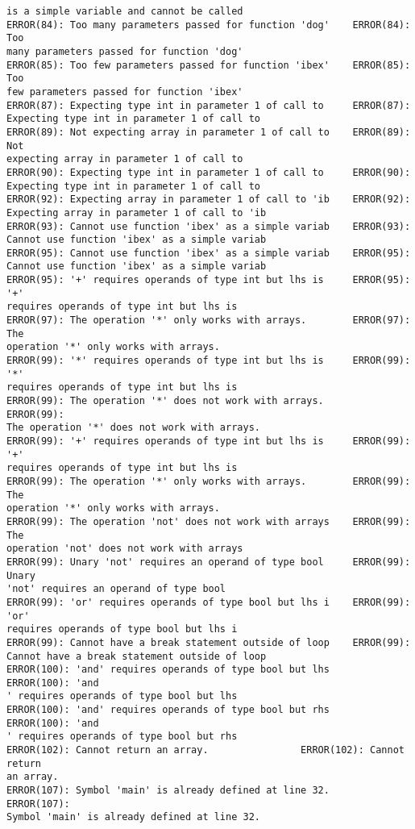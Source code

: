 \documentclass[12pt]{book}
\begin{document}
\begin{lstlisting}
is a simple variable and cannot be called
ERROR(84): Too many parameters passed for function 'dog'    ERROR(84): Too 
many parameters passed for function 'dog'
ERROR(85): Too few parameters passed for function 'ibex'    ERROR(85): Too 
few parameters passed for function 'ibex'
ERROR(87): Expecting type int in parameter 1 of call to     ERROR(87): 
Expecting type int in parameter 1 of call to 
ERROR(89): Not expecting array in parameter 1 of call to    ERROR(89): Not 
expecting array in parameter 1 of call to
ERROR(90): Expecting type int in parameter 1 of call to     ERROR(90): 
Expecting type int in parameter 1 of call to 
ERROR(92): Expecting array in parameter 1 of call to 'ib    ERROR(92): 
Expecting array in parameter 1 of call to 'ib
ERROR(93): Cannot use function 'ibex' as a simple variab    ERROR(93): 
Cannot use function 'ibex' as a simple variab
ERROR(95): Cannot use function 'ibex' as a simple variab    ERROR(95): 
Cannot use function 'ibex' as a simple variab
ERROR(95): '+' requires operands of type int but lhs is     ERROR(95): '+' 
requires operands of type int but lhs is 
ERROR(97): The operation '*' only works with arrays.        ERROR(97): The 
operation '*' only works with arrays.
ERROR(99): '*' requires operands of type int but lhs is     ERROR(99): '*' 
requires operands of type int but lhs is 
ERROR(99): The operation '*' does not work with arrays.        ERROR(99): 
The operation '*' does not work with arrays.
ERROR(99): '+' requires operands of type int but lhs is     ERROR(99): '+' 
requires operands of type int but lhs is 
ERROR(99): The operation '*' only works with arrays.        ERROR(99): The 
operation '*' only works with arrays.
ERROR(99): The operation 'not' does not work with arrays    ERROR(99): The 
operation 'not' does not work with arrays
ERROR(99): Unary 'not' requires an operand of type bool     ERROR(99): Unary
'not' requires an operand of type bool 
ERROR(99): 'or' requires operands of type bool but lhs i    ERROR(99): 'or' 
requires operands of type bool but lhs i
ERROR(99): Cannot have a break statement outside of loop    ERROR(99): 
Cannot have a break statement outside of loop
ERROR(100): 'and' requires operands of type bool but lhs    ERROR(100): 'and
' requires operands of type bool but lhs
ERROR(100): 'and' requires operands of type bool but rhs    ERROR(100): 'and
' requires operands of type bool but rhs
ERROR(102): Cannot return an array.                ERROR(102): Cannot return
an array.
ERROR(107): Symbol 'main' is already defined at line 32.    ERROR(107): 
Symbol 'main' is already defined at line 32.

\end{lstlisting}
\end{document}
